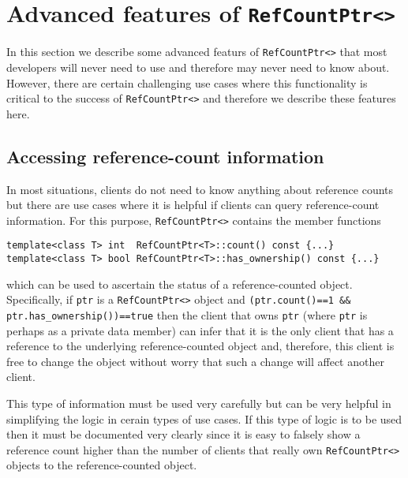 %
\section{Advanced features of {}\texttt{RefCountPtr<>}}
%

In this section we describe some advanced featurs of
{}\texttt{RefCountPtr<>} that most developers will never need to use
and therefore may never need to know about.  However, there are
certain challenging use cases where this functionality is critical to
the success of {}\texttt{RefCountPtr<>} and therefore we describe
these features here.

%
\subsection{Accessing reference-count information}
%

In most situations, clients do not need to know anything about
reference counts but there are use cases where it is helpful if
clients can query reference-count information.  For this purpose,
{}\texttt{RefCountPtr<>} contains the member functions

{\scriptsize\begin{verbatim}
template<class T> int  RefCountPtr<T>::count() const {...}
template<class T> bool RefCountPtr<T>::has_ownership() const {...}
\end{verbatim}}

{}\noindent{}which can be used to ascertain the status of a
reference-counted object.  Specifically, if {}\texttt{ptr} is a
{}\texttt{RefCountPtr<>} object and {}\texttt{(ptr.count()==1 \&\&
ptr.has\_ownership())==true} then the client that owns {}\texttt{ptr}
(where {}\texttt{ptr} is perhaps as a private data member) can infer
that it is the only client that has a reference to the underlying
reference-counted object and, therefore, this client is free to change
the object without worry that such a change will affect another
client.

This type of information must be used very carefully but can be very
helpful in simplifying the logic in cerain types of use cases. If this
type of logic is to be used then it must be documented very clearly
since it is easy to falsely show a reference count higher than the
number of clients that really own {}\texttt{RefCountPtr<>} objects to
the reference-counted object.

%
%
%
%

